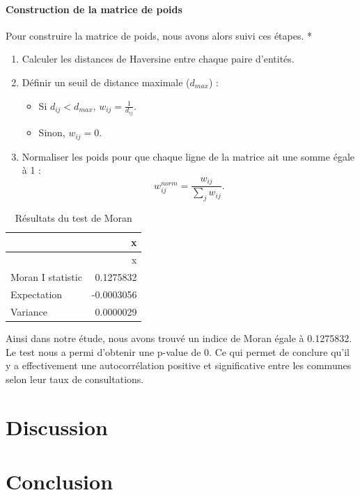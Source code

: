 \documentclass[
]{article}
\providecommand{\tightlist}{%
  \setlength{\itemsep}{0pt}\setlength{\parskip}{0pt}}
\begin{document}
\paragraph{Construction de la matrice de
poids}\label{construction-de-la-matrice-de-poids}

Pour construire la matrice de poids, nous avons alors suivi ces étapes.
*

\begin{enumerate}
\def\labelenumi{\arabic{enumi}.}
\tightlist
\item
  Calculer les distances de Haversine entre chaque paire d'entités.
\item
  Définir un seuil de distance maximale (\(d_{max}\)) :

  \begin{itemize}
  \tightlist
  \item
    Si \(d_{ij} < d_{max}\), \(w_{ij} = \frac{1}{d_{ij}}\).
  \item
    Sinon, \(w_{ij} = 0\).
  \end{itemize}
\item
  Normaliser les poids pour que chaque ligne de la matrice ait une somme
  égale à 1 : \[
   w_{ij}^{norm} = \frac{w_{ij}}{\sum_{j} w_{ij}}.
  \]
\end{enumerate}

\begin{longtable}[]{@{}lr@{}}
\caption{Résultats du test de Moran}\tabularnewline
\toprule\noalign{}
& x \\
\midrule\noalign{}
\endfirsthead
\toprule\noalign{}
& x \\
\midrule\noalign{}
\endhead
\bottomrule\noalign{}
\endlastfoot
Moran I statistic & 0.1275832 \\
Expectation & -0.0003056 \\
Variance & 0.0000029 \\
\end{longtable}

Ainsi dans notre étude, nous avons trouvé un indice de Moran égale à
0.1275832. Le test nous a permi d'obtenir une p-value de 0. Ce qui
permet de conclure qu'il y a effectivement une autocorrélation positive
et significative entre les communes selon leur taux de consultations.

\section{Discussion}\label{discussion}

\section{Conclusion}\label{conclusion}
\end{document}
